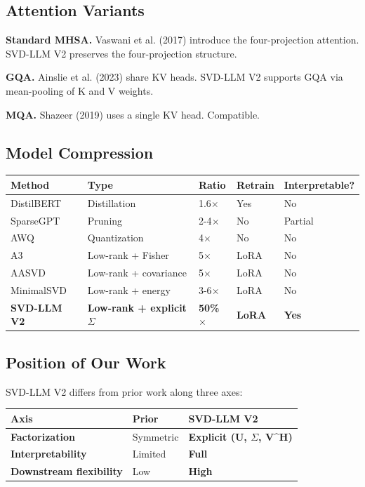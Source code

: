 \subsection{Attention Variants}

\textbf{Standard MHSA.} Vaswani et al. (2017) introduce the four-projection 
attention. SVD-LLM V2 preserves the four-projection structure.

\textbf{GQA.} Ainslie et al. (2023) share KV heads. SVD-LLM V2 supports GQA via 
mean-pooling of K and V weights.

\textbf{MQA.} Shazeer (2019) uses a single KV head. Compatible.

\subsection{Model Compression}

\begin{table}[H]
\centering
\small
\begin{tabular}{lllll}
\toprule
\textbf{Method} & \textbf{Type} & \textbf{Ratio} & \textbf{Retrain} & \textbf{Interpretable?} \\
\midrule
DistilBERT & Distillation & 1.6$\times$ & Yes & No \\
SparseGPT & Pruning & 2-4$\times$ & No & Partial \\
AWQ & Quantization & 4$\times$ & No & No \\
A3 & Low-rank + Fisher & 5$\times$ & LoRA & No \\
AASVD & Low-rank + covariance & 5$\times$ & LoRA & No \\
MinimalSVD & Low-rank + energy & 3-6$\times$ & LoRA & No \\
\textbf{SVD-LLM V2} & \textbf{Low-rank + explicit $\Sigma$} & \textbf{50\%$\times$} & \textbf{LoRA} & \textbf{Yes} \\
\bottomrule
\end{tabular}
\end{table}

\subsection{Position of Our Work}

SVD-LLM V2 differs from prior work along three axes:

\begin{table}[H]
\centering
\small
\begin{tabular}{lll}
\toprule
\textbf{Axis} & \textbf{Prior} & \textbf{SVD-LLM V2} \\
\midrule
\textbf{Factorization} & Symmetric & \textbf{Explicit (U, $\Sigma$, V^H)} \\
\textbf{Interpretability} & Limited & \textbf{Full} \\
\textbf{Downstream flexibility} & Low & \textbf{High} \\
\bottomrule
\end{tabular}
\end{table}

